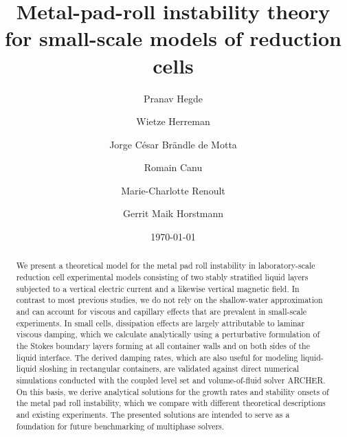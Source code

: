 \documentclass[aps,prfluids,reprint,superscriptaddress]{revtex4-2}
\begin{document}

\title{Metal-pad-roll instability theory for small-scale models of reduction cells}

\author{Pranav Hegde}
\author{Wietze Herreman}
\author{Jorge C\'esar Br\"andle de Motta}
\author{Romain Canu}
\author{Marie-Charlotte Renoult}
\author{Gerrit Maik Horstmann}


\date{\today}

\begin{abstract}
	We present a theoretical model for the metal pad roll instability in laboratory-scale reduction cell experimental models consisting of two stably stratified liquid layers subjected to a vertical electric current and a likewise vertical magnetic field. In contrast to most previous studies, we do not rely on the shallow-water approximation and can account for viscous and capillary effects that are prevalent in small-scale experiments. In small cells, dissipation effects are largely attributable to laminar viscous damping, which we calculate analytically using a perturbative formulation of the Stokes boundary layers forming at all container walls and on both sides of the liquid interface. The derived damping rates, which are also useful for modeling liquid-liquid sloshing in rectangular containers, are validated against direct numerical simulations conducted with the coupled level set and volume-of-fluid solver ARCHER. On this basis, we derive analytical solutions for the growth rates and stability onsets of the metal pad roll instability, which we compare with different theoretical descriptions and existing experiments. The presented solutions are intended to serve as a foundation for future benchmarking of multiphase solvers.
\end{abstract}
\end{document}
